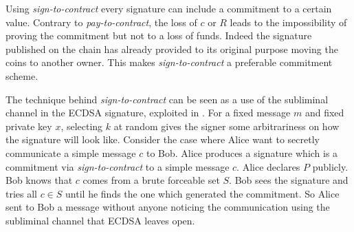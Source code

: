 Using \textit{sign-to-contract} every signature can include a commitment to a certain value. Contrary to \textit{pay-to-contract}, the loss of $c$ or $R$ leads to the impossibility of proving the commitment but not to a loss of funds. Indeed the signature published on the chain has already provided to its original purpose moving the coins to another owner. This makes \textit{sign-to-contract} a preferable commitment scheme.

The technique behind \textit{sign-to-contract} can be seen as a use of the subliminal channel in the ECDSA signature, exploited in \cite{DBLP:journals/jsac/Simmons98}. 
For a fixed message $m$ and fixed private key $x$, selecting $k$ at random gives the signer some arbitrariness on how the signature will look like. 
Consider the case where Alice want to secretly communicate a simple message $c$ to Bob. Alice produces a signature which is a commitment via \textit{sign-to-contract} to a simple message $c$. Alice declares $P$ publicly. Bob knows that $c$ comes from a brute forceable set $S$. Bob sees the signature and tries all $c \in S$ until he finds the one which generated the commitment. So Alice sent to Bob a message without anyone noticing the communication using the subliminal channel that ECDSA leaves open.